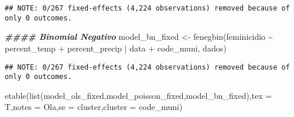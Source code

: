 \documentclass[
]{article}
\newenvironment{Shaded}{\begin{snugshade}}{\end{snugshade}}
\newcommand{\AttributeTok}[1]{\textcolor[rgb]{0.77,0.63,0.00}{#1}}
\newcommand{\DocumentationTok}[1]{\textcolor[rgb]{0.56,0.35,0.01}{\textbf{\textit{#1}}}}
\newcommand{\FunctionTok}[1]{\textcolor[rgb]{0.00,0.00,0.00}{#1}}
\newcommand{\NormalTok}[1]{#1}
\newcommand{\OtherTok}[1]{\textcolor[rgb]{0.56,0.35,0.01}{#1}}
\newcommand{\SpecialCharTok}[1]{\textcolor[rgb]{0.00,0.00,0.00}{#1}}
\newcommand{\StringTok}[1]{\textcolor[rgb]{0.31,0.60,0.02}{#1}}
\begin{document}
\begin{verbatim}
## NOTE: 0/267 fixed-effects (4,224 observations) removed because of only 0 outcomes.
\end{verbatim}

\begin{Shaded}
\begin{Highlighting}[]
\DocumentationTok{\#\#\#\# Binomial Negativo}
\NormalTok{model\_bn\_fixed }\OtherTok{\textless{}{-}} \FunctionTok{fenegbin}\NormalTok{(feminicidio  }\SpecialCharTok{\textasciitilde{}}\NormalTok{ percent\_temp }\SpecialCharTok{+}\NormalTok{ percent\_precip }\SpecialCharTok{|}\NormalTok{ data }\SpecialCharTok{+}\NormalTok{ code\_muni, dados)}
\end{Highlighting}
\end{Shaded}

\begin{verbatim}
## NOTE: 0/267 fixed-effects (4,224 observations) removed because of only 0 outcomes.
\end{verbatim}

\begin{Shaded}
\begin{Highlighting}[]
\FunctionTok{etable}\NormalTok{(}\FunctionTok{list}\NormalTok{(model\_ols\_fixed,model\_poisson\_fixed,model\_bn\_fixed),}\AttributeTok{tex =}\NormalTok{ T,}\AttributeTok{notes =} \StringTok{\textquotesingle{}Ola\textquotesingle{}}\NormalTok{,}\AttributeTok{se =} \StringTok{\textquotesingle{}cluster\textquotesingle{}}\NormalTok{,}\AttributeTok{cluster =} \StringTok{\textquotesingle{}code\_muni\textquotesingle{}}\NormalTok{)}
\end{Highlighting}
\end{Shaded}
\end{document}
